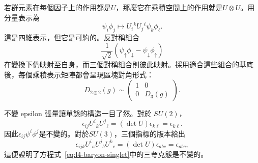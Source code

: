 若群元素在每個因子上的作用都是\(U\)，那麼它在乘積空間上的作用就是\(U\otimes U\)。用分量表示為
\begin{equation}
\psi_i\phi_j
\longmapsto
U_i{}^kU_j{}^\ell\psi_k\phi_\ell.
\label{eq:l4-product-action}
\end{equation}
這是四維表示，但它是可約的。反對稱組合
\begin{equation}
\frac{1}{\sqrt2}
(\psi_\uparrow\phi_\downarrow
-\psi_\downarrow\phi_\uparrow)
\end{equation}
在變換下仍映射至自身，而三個對稱組合則彼此映射。採用適合這些組合的基底後，每個乘積表示矩陣都會呈現區塊對角形式：
\begin{equation}
D_{2\otimes2}(g)
\sim
\begin{pmatrix}
1&0\\
0&D_3(g)
\end{pmatrix}.
\label{eq:l4-spin-block-diagonal}
\end{equation}

\begin{classroomqa}
\end{classroomqa}

\begin{classroomqa}
\end{classroomqa}

不變 epsilon 張量讓單態的構造一目了然。對於
\(SU(2)\)，
\begin{equation}
\epsilon_{ij}U^i{}_kU^j{}_\ell
=(\det U)\epsilon_{k\ell}
=\epsilon_{k\ell}.
\end{equation}
因此\(\epsilon_{ij}\psi^i\phi^j\)是不變的。對於\(SU(3)\)，三個指標的版本給出
\begin{equation}
\epsilon_{ijk}U^i{}_aU^j{}_bU^k{}_c
=(\det U)\epsilon_{abc}
=\epsilon_{abc},
\end{equation}
這便證明了方程式~\eqref{eq:l4-baryon-singlet}中的三夸克態是不變的。

